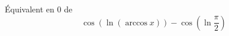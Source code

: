  \'{E}quivalent en 0 de
\[\cos \left( \ln (\arccos x)\right)-\cos \left( \ln \frac{\pi}{2} \right)\]
\bigskip \bigskip 